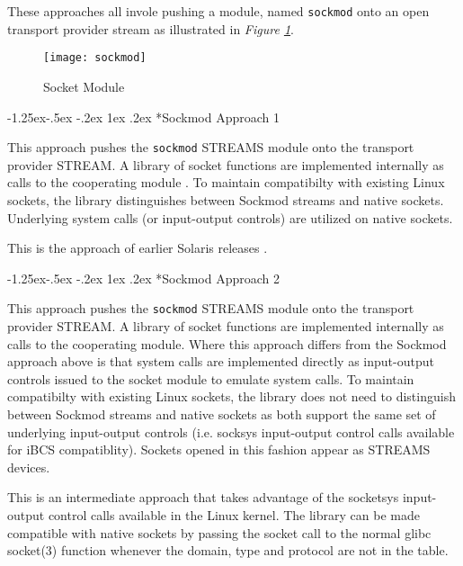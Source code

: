 \documentclass[letterpaper,final,notitlepage,twocolumn,10pt,twoside]{article}
\makeatletter
\renewcommand\subsubsection{\@startsection{subsubsection}{3}{\z@}%
                                     {-1.25ex\@plus -.5ex \@minus -.2ex}%
                                     {1ex \@plus .2ex}%
                                     {\normalfont\normalsize\bfseries}}
\makeatother
\begin{document}
These approaches all invole pushing a module, named \texttt{sockmod} onto an
open transport provider stream as illustrated in \textit{Figure
\ref{figure:sockmod}}.

\begin{figure}[hbtp]
\begin{center}
\texttt{[image: sockmod]}
\end{center}
\caption[Socket Module]{Socket Module}
\label{figure:sockmod}
\end{figure}

\subsubsection*{Sockmod Approach 1}

This approach pushes the \texttt{sockmod} STREAMS module onto the transport
provider STREAM.  A library of socket functions are implemented internally as
calls to the cooperating module \cite[]{impbsd}.
To maintain compatibilty with existing Linux sockets, the library
distinguishes between Sockmod streams and native sockets.  Underlying system calls
(or input-output controls) are utilized on native sockets.

This is the approach of earlier Solaris releases \cite[]{impbsd}.

\subsubsection*{Sockmod Approach 2}

This approach pushes the \texttt{sockmod} STREAMS module onto the transport
provider STREAM.  A library of socket functions are implemented internally as
calls to the cooperating module.  Where this approach differs from the Sockmod
approach above is that system calls are implemented directly as input-output
controls issued to the socket module to emulate system calls.
To maintain compatibilty with existing Linux sockets, the library
does not need to distinguish between Sockmod streams and native sockets as
both support the same set of underlying input-output controls (i.e. socksys
input-output control calls available for iBCS compatiblity).  Sockets opened
in this fashion appear as STREAMS devices.

This is an intermediate approach that takes advantage of the socketsys
input-output control calls available in the Linux kernel.
The library can be made compatible with native sockets by passing the socket
call to the normal glibc socket(3) function whenever the domain, type and
protocol are not in the table.
\end{document}
